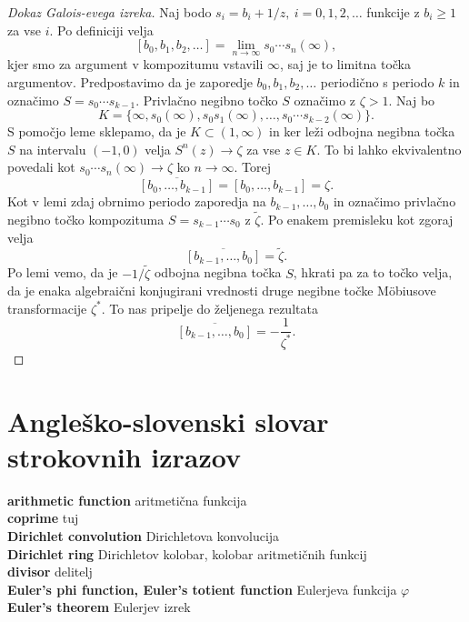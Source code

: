 \documentclass[a4paper,12pt]{article}
\newcommand{\geslo}[2]{\noindent\textbf{#1} \quad \hangindent=1cm #2\\[-1pc]}
\begin{document}
\begin{proof}[Dokaz Galois-evega izreka]
    Naj bodo $s_i = b_i + 1/z,\ i = 0, 1, 2, \ldots$ funkcije z $b_i \geq 1$ za vse $i$. Po definiciji velja
    \[
        [b_0, b_1, b_2, \ldots] = \lim_{n \to \infty} s_0\cdots s_n (\infty),   
    \]
    kjer smo za argument v kompozitumu vstavili $\infty$, saj je to limitna točka argumentov. Predpostavimo da je zaporedje $b_0, b_1, b_2, \ldots$ periodično s periodo $k$ in označimo $S = s_0\cdots s_{k-1}$. Privlačno negibno točko $S$ označimo z $\zeta > 1$. Naj bo
    \[
        K = \{ \infty, s_0(\infty), s_0s_1(\infty), \ldots, s_0\cdots s_{k-2}(\infty)\}.
    \]
    S pomočjo leme sklepamo, da je $K \subset (1, \infty)$ in ker leži odbojna negibna točka $S$ na intervalu $(-1, 0)$ velja $S^n(z) \to \zeta$ za vse $z \in K$. To bi lahko ekvivalentno povedali kot $s_0\cdots s_n(\infty) \to \zeta$ ko $n \to \infty$. Torej
    \[
        \overline{[b_0, \ldots, b_{k-1}]} = [b_0, \ldots, b_{k-1}] = \zeta.
    \]
    Kot v lemi zdaj obrnimo periodo zaporedja na $b_{k-1}, \ldots, b_0$ in označimo privlačno negibno točko kompozituma $S = s_{k-1}\cdots s_0$ z $\tilde{\zeta}$. Po enakem premisleku kot zgoraj velja
    \[
        \overline{[b_{k-1}, \ldots, b_0]} = \tilde{\zeta}.
    \]
    Po lemi vemo, da je $- 1 / \tilde{\zeta}$ odbojna negibna točka $S$, hkrati pa za to točko velja, da je enaka algebraični konjugirani vrednosti druge negibne točke M\"{o}biusove transformacije $\zeta^*$. To nas pripelje do željenega rezultata
    \[
        \overline{[b_{k-1}, \ldots, b_0]} = - \frac{1}{\zeta^*}.
    \]
\end{proof}




\section*{Angleško-slovenski slovar strokovnih izrazov}


\geslo{arithmetic function}{aritmetična funkcija}

\geslo{coprime}{tuj}

\geslo{Dirichlet convolution}{Dirichletova konvolucija}

\geslo{Dirichlet ring}{Dirichletov kolobar, kolobar aritmetičnih funkcij}

\geslo{divisor}{delitelj}

\geslo{Euler's phi function, Euler's totient function}{Eulerjeva funkcija $\varphi$}

\geslo{Euler's theorem}{Eulerjev izrek}
\end{document}
